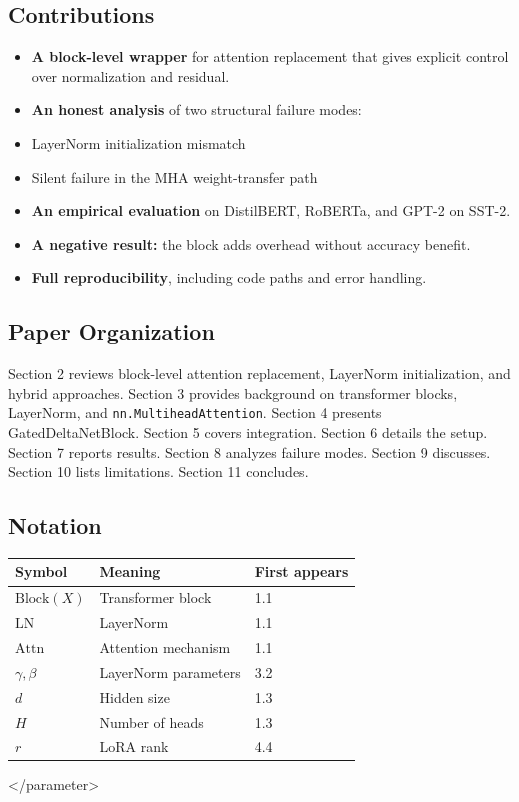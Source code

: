 \subsection{Contributions}

\begin{itemize}
\item \textbf{A block-level wrapper} for attention replacement that gives explicit
  control over normalization and residual.
\item \textbf{An honest analysis} of two structural failure modes:
\item LayerNorm initialization mismatch
\item Silent failure in the MHA weight-transfer path
\item \textbf{An empirical evaluation} on DistilBERT, RoBERTa, and GPT-2 on SST-2.
\item \textbf{A negative result:} the block adds overhead without accuracy benefit.
\item \textbf{Full reproducibility}, including code paths and error handling.

\end{itemize}
\subsection{Paper Organization}

Section 2 reviews block-level attention replacement, LayerNorm 
initialization, and hybrid approaches. Section 3 provides background on 
transformer blocks, LayerNorm, and \texttt{nn.MultiheadAttention}. Section 4 
presents GatedDeltaNetBlock. Section 5 covers integration. Section 6 
details the setup. Section 7 reports results. Section 8 analyzes failure 
modes. Section 9 discusses. Section 10 lists limitations. Section 11 
concludes.



\subsection{Notation}

\begin{table}[H]
\centering
\small
\begin{tabular}{lll}
\toprule
\textbf{Symbol} & \textbf{Meaning} & \textbf{First appears} \\
\midrule
$\text{Block}(X)$ & Transformer block & 1.1 \\
$\text{LN}$ & LayerNorm & 1.1 \\
$\text{Attn}$ & Attention mechanism & 1.1 \\
$\gamma, \beta$ & LayerNorm parameters & 3.2 \\
$d$ & Hidden size & 1.3 \\
$H$ & Number of heads & 1.3 \\
$r$ & LoRA rank & 4.4 \\
\bottomrule
\end{tabular}
\end{table}
</parameter>

